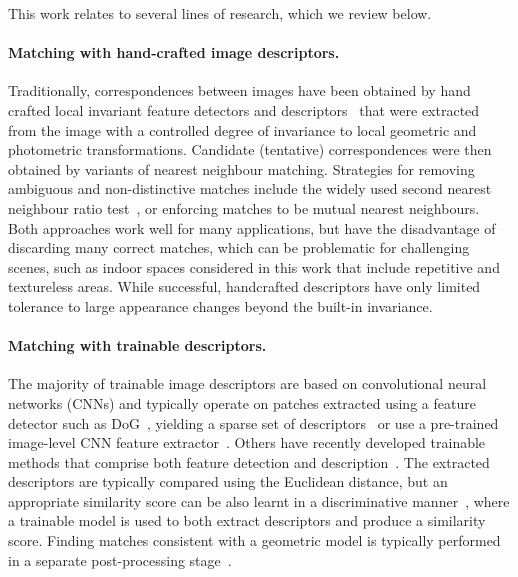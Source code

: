 \documentclass{article}
\begin{document}
This work relates to several lines of research, which we review below.


\paragraph{Matching with hand-crafted image descriptors.}
Traditionally, correspondences between images have been obtained by hand crafted local invariant feature detectors and descriptors~\cite{lowe2004distinctive,mikolajczyk2002affine,Tuytelaars08} that were extracted from the image with a controlled degree of invariance to local geometric and photometric transformations. Candidate (tentative) correspondences were then obtained by variants of nearest neighbour matching. Strategies for removing ambiguous and non-distinctive matches include the widely used second nearest neighbour ratio test~\cite{lowe2004distinctive}, or enforcing matches to be mutual nearest neighbours. Both  approaches work well for many applications, but have the disadvantage of discarding many correct matches, which can be problematic for challenging scenes, such as indoor spaces considered in this work that include repetitive and textureless areas. While successful, handcrafted descriptors have only limited tolerance to large appearance changes beyond the built-in invariance.


\paragraph{Matching with trainable descriptors.}
The majority of trainable image descriptors are based on convolutional neural networks (CNNs) and typically operate on patches extracted using a feature detector such as DoG~\cite{lowe2004distinctive}, yielding a sparse set of descriptors~\cite{jahrer2008learned, fischer2014descriptor, balntas2016pn, ConvOpt,DeepDesc,TFeat} or use a pre-trained image-level CNN feature extractor~\cite{noh2017large,Savinov17}. Others have recently developed trainable methods that comprise both feature detection and description~\cite{yi2016lift,choy_nips16,noh2017large}.
The extracted descriptors are typically compared using the Euclidean distance, but an appropriate similarity score can be also learnt in a discriminative manner~\cite{zagoruyko2015learning, han2015matchnet}, where a trainable model is used to both extract descriptors and produce a similarity score. Finding matches consistent with a geometric model is typically performed in a separate post-processing stage~\cite{long2014convnets,jahrer2008learned, fischer2014descriptor, balntas2016pn, ConvOpt,DeepDesc,TFeat,yi2016lift,choy_nips16,noh2017large}.
\end{document}
